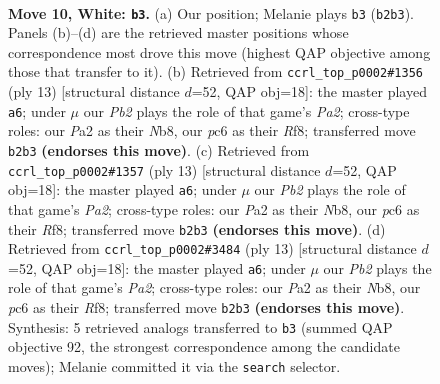 \documentclass[11pt]{article}
\begin{document}
\clearpage

\begin{figure}[p]\centering
\begin{subfigure}{0.46\textwidth}\centering
\resizebox{\linewidth}{!}{%
\newchessgame
\chessboard[
  setfen={r1b2rk1/ppq1bppp/n1p1pn2/8/2NP4/5PP1/PP2P1BP/RNBQ1RK1 w - - 1 10},
  showmover=false,
  pgfstyle=straightmove, color=movearrow, markmove={b2-b3}
]}
\caption{}
\end{subfigure}\hfill
\begin{subfigure}{0.46\textwidth}\centering
\resizebox{\linewidth}{!}{%
\newchessgame
\chessboard[
  setfen={rnbq1rk1/ppp1bppp/4pn2/8/2pP4/5NP1/PPQ1PPBP/RNB2RK1 b - - 1 7},
  showmover=false,
  pgfstyle=straightmove, color=movearrow, markmove={a7-a6}
]}
\caption{}
\end{subfigure}
\\[4pt]
\begin{subfigure}{0.46\textwidth}\centering
\resizebox{\linewidth}{!}{%
\newchessgame
\chessboard[
  setfen={rnbq1rk1/ppp1bppp/4pn2/8/2pP4/5NP1/PPQ1PPBP/RNB2RK1 b - - 1 7},
  showmover=false,
  pgfstyle=straightmove, color=movearrow, markmove={a7-a6}
]}
\caption{}
\end{subfigure}\hfill
\begin{subfigure}{0.46\textwidth}\centering
\resizebox{\linewidth}{!}{%
\newchessgame
\chessboard[
  setfen={rnbq1rk1/ppp1bppp/4pn2/8/2pP4/5NP1/PPQ1PPBP/RNB2RK1 b - - 1 7},
  showmover=false,
  pgfstyle=straightmove, color=movearrow, markmove={a7-a6}
]}
\caption{}
\end{subfigure}
\caption{\textbf{Move 10, White: \texttt{b3}.} (a) Our position; Melanie plays \texttt{b3} (\texttt{b2b3}). Panels (b)--(d) are the retrieved master positions whose correspondence most drove this move (highest QAP objective among those that transfer to it). (b) Retrieved from \texttt{ccrl\_top\_p0002\#1356} (ply 13) [structural distance $d$=52, QAP obj=18]: the master played \texttt{a6}; under $\mu$ our \emph{Pb2} plays the role of that game's \emph{Pa2}; cross-type roles: our \emph{P}a2 as their \emph{N}b8, our \emph{p}c6 as their \emph{R}f8; transferred move \texttt{b2b3} \textbf{(endorses this move)}. (c) Retrieved from \texttt{ccrl\_top\_p0002\#1357} (ply 13) [structural distance $d$=52, QAP obj=18]: the master played \texttt{a6}; under $\mu$ our \emph{Pb2} plays the role of that game's \emph{Pa2}; cross-type roles: our \emph{P}a2 as their \emph{N}b8, our \emph{p}c6 as their \emph{R}f8; transferred move \texttt{b2b3} \textbf{(endorses this move)}. (d) Retrieved from \texttt{ccrl\_top\_p0002\#3484} (ply 13) [structural distance $d$=52, QAP obj=18]: the master played \texttt{a6}; under $\mu$ our \emph{Pb2} plays the role of that game's \emph{Pa2}; cross-type roles: our \emph{P}a2 as their \emph{N}b8, our \emph{p}c6 as their \emph{R}f8; transferred move \texttt{b2b3} \textbf{(endorses this move)}. Synthesis: 5 retrieved analogs transferred to \texttt{b3} (summed QAP objective 92, the strongest correspondence among the candidate moves); Melanie committed it via the \texttt{search} selector.}
\label{fig:thought-m18}
\end{figure}
\end{document}
